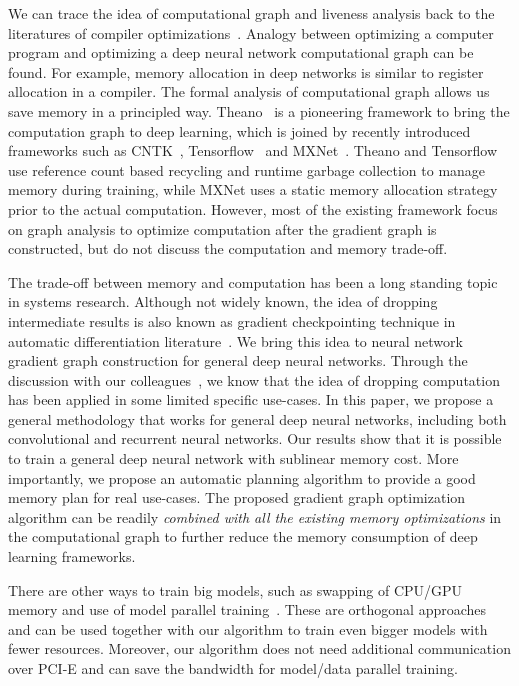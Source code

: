 We can trace the idea of computational graph and liveness analysis back to the literatures of compiler optimizations~\cite{Aho:DragonBook}. Analogy between optimizing a computer program and optimizing a deep neural network computational graph can be found. For example, memory allocation in deep networks is similar to register allocation in a compiler. The formal analysis of computational graph allows us save memory in a principled way. Theano~\cite{bergstra+al:2010-scipy,Bastien-Theano-2012} is a pioneering framework to bring the computation graph to deep learning, which is joined by recently introduced frameworks such as CNTK~\cite{CNTK}, Tensorflow~\cite
{tensorflow2015-whitepaper} and MXNet~\cite{MXNet-whitepaper}. Theano and Tensorflow use reference count based recycling and runtime garbage collection to manage memory during training, while MXNet uses a static memory allocation strategy prior to the actual computation. However, most of the existing framework focus on graph analysis to optimize computation after the gradient graph is constructed, but do not discuss the computation and memory trade-off.

The trade-off between memory and computation has been a long standing topic in systems research. Although not widely known, the idea of dropping intermediate results is also known as gradient checkpointing technique in automatic differentiation literature~\cite{Griewank:resolve}. We bring this idea to neural network gradient graph construction for general deep neural networks. Through the discussion with our colleagues~\cite{Yu:Highway}, we know that the idea of dropping computation has been applied in some limited specific use-cases. In this paper, we propose a general methodology that works for general deep neural networks, including both convolutional and recurrent neural networks. Our results show that it is possible to train a general deep neural network with sublinear memory cost. More importantly, we propose an automatic planning algorithm to provide a good memory plan for real use-cases. The proposed gradient graph optimization algorithm can be readily \emph{combined with all the existing memory optimizations} in the computational graph to further reduce the memory consumption of deep learning frameworks.

There are other ways to train big models, such as swapping of CPU/GPU memory and use of model parallel training~\cite{GoogleDisbelief, rhu2016virtualizing}. These are orthogonal approaches and can be used together with our algorithm to train even bigger models with fewer resources. Moreover, our algorithm does not need additional communication over PCI-E and can save the bandwidth for model/data parallel training.


